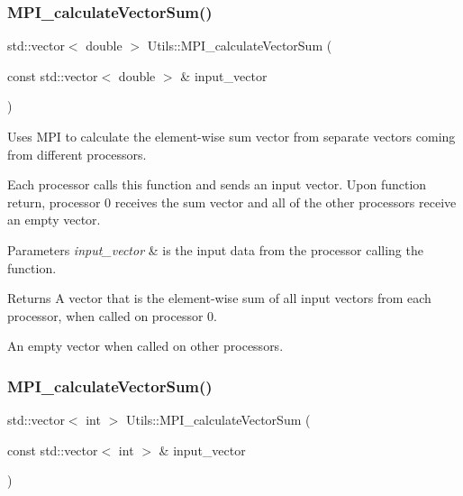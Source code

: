 \subsubsection{\texorpdfstring{M\+P\+I\+\_\+calculate\+Vector\+Sum()}{MPI\_calculateVectorSum()}\hspace{0.1cm}{\footnotesize\ttfamily [1/2]}}
{\footnotesize\ttfamily std\+::vector$<$ double $>$ Utils\+::\+M\+P\+I\+\_\+calculate\+Vector\+Sum (\begin{DoxyParamCaption}\item[{const std\+::vector$<$ double $>$ \&}]{input\+\_\+vector }\end{DoxyParamCaption})}



Uses M\+PI to calculate the element-\/wise sum vector from separate vectors coming from different processors. 

Each processor calls this function and sends an input vector. Upon function return, processor 0 receives the sum vector and all of the other processors receive an empty vector. 
\begin{DoxyParams}{Parameters}
{\em input\+\_\+vector} & is the input data from the processor calling the function. \\
\hline
\end{DoxyParams}
\begin{DoxyReturn}{Returns}
A vector that is the element-\/wise sum of all input vectors from each processor, when called on processor 0. 

An empty vector when called on other processors. 
\end{DoxyReturn}
\mbox{\label{namespace_utils_ad7b634b14633046c6da126945d688aaf}} 
\subsubsection{\texorpdfstring{M\+P\+I\+\_\+calculate\+Vector\+Sum()}{MPI\_calculateVectorSum()}\hspace{0.1cm}{\footnotesize\ttfamily [2/2]}}
{\footnotesize\ttfamily std\+::vector$<$ int $>$ Utils\+::\+M\+P\+I\+\_\+calculate\+Vector\+Sum (\begin{DoxyParamCaption}\item[{const std\+::vector$<$ int $>$ \&}]{input\+\_\+vector }\end{DoxyParamCaption})}



